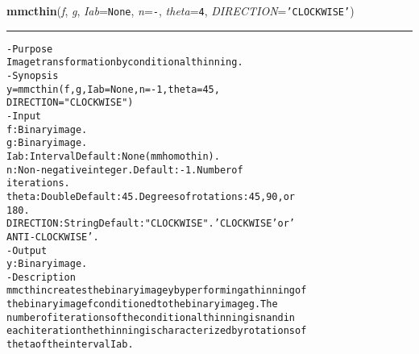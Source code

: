     \begin{boxedminipage}{\textwidth}

    \raggedright \textbf{mmcthin}(\textit{f}, \textit{g}, \textit{Iab}=\texttt{N\-o\-n\-e\-}, \textit{n}=\texttt{-\-}, \textit{theta}=\texttt{4\-}, \textit{DIRECTION}=\texttt{'\-C\-L\-O\-C\-K\-W\-I\-S\-E\-'\-})

    \vspace{-1.5ex}

    \rule{\textwidth}{0.5\fboxrule}
\begin{alltt}
- Purpose
    Image transformation by conditional thinning.
- Synopsis
    y = mmcthin(f, g, Iab=None, n=-1, theta=45,
    DIRECTION="CLOCKWISE")
- Input
    f:         Binary image.
    g:         Binary image.
    Iab:       Interval Default: None (mmhomothin).
    n:         Non-negative integer. Default: -1. Number of
               iterations.
    theta:     Double Default: 45. Degrees of rotations: 45, 90, or
               180.
    DIRECTION: String Default: "CLOCKWISE". 'CLOCKWISE' or '
               ANTI-CLOCKWISE'.
- Output
    y: Binary image.
- Description
    mmcthin creates the binary image y by performing a thinning of
    the binary image f conditioned to the binary image g . The
    number of iterations of the conditional thinning is n and in
    each iteration the thinning is characterized by rotations of
    theta of the interval Iab .\end{alltt}

    \vspace{1ex}

    \end{boxedminipage}

    \label{multireg:num_pymorph:mmcwatershed}
    \vspace{0.5ex}

